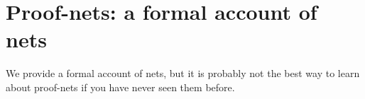 \chapter{Proof-nets: a formal account of nets}\label{proof-nets}

We provide a formal account of nets, but it is probably not the best way to learn about proof-nets if you have never seen them before.


